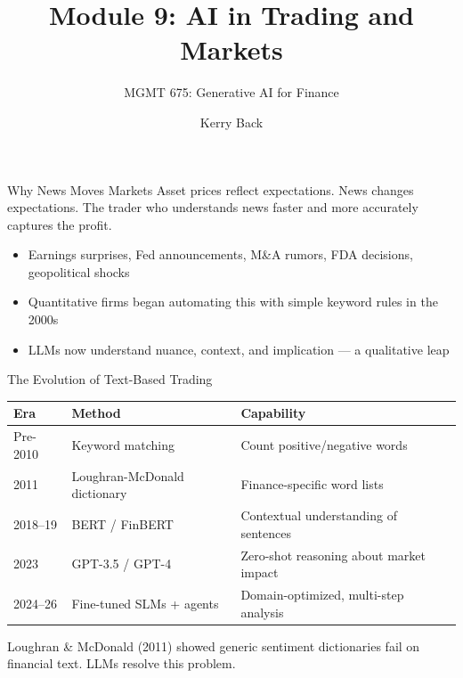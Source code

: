 \documentclass[aspectratio=169]{beamer}
\subtitle{MGMT 675: Generative AI for Finance}
\title{Module 9: AI in Trading and Markets}
\author{Kerry Back}
\date{}
\begin{document}
\maketitle


\begin{frame}{Why News Moves Markets}
Asset prices reflect expectations. News changes expectations. The trader who \alert{understands news faster and more accurately} captures the profit.
\vspace{0.3cm}
\begin{itemize}
  \item Earnings surprises, Fed announcements, M\&A rumors, FDA decisions, geopolitical shocks
  \item Quantitative firms began automating this with simple keyword rules in the 2000s
  \item \alert{LLMs now understand nuance, context, and implication} --- a qualitative leap
\end{itemize}
\end{frame}

\begin{frame}{The Evolution of Text-Based Trading}
\begin{center}
\small
\begin{tabular}{@{} l l l @{}}
\toprule
\textbf{Era} & \textbf{Method} & \textbf{Capability} \\
\midrule
Pre-2010 & Keyword matching & Count positive/negative words \\
2011 & Loughran-McDonald dictionary & Finance-specific word lists \\
2018--19 & BERT / FinBERT & Contextual understanding of sentences \\
2023 & GPT-3.5 / GPT-4 & Zero-shot reasoning about market impact \\
2024--26 & Fine-tuned SLMs + agents & Domain-optimized, multi-step analysis \\
\bottomrule
\end{tabular}
\end{center}
\vspace{0.3cm}
Loughran \& McDonald (2011) showed generic sentiment dictionaries fail on financial text. LLMs resolve this problem.
\end{frame}

\end{document}
